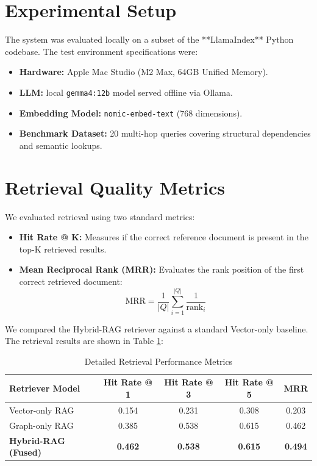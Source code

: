 \documentclass[12pt,a4paper,oneside]{report}
\begin{document}
\section{Experimental Setup}
The system was evaluated locally on a subset of the **LlamaIndex** Python codebase. The test environment specifications were:
\begin{itemize}
    \item \textbf{Hardware:} Apple Mac Studio (M2 Max, 64GB Unified Memory).
    \item \textbf{LLM:} local \texttt{gemma4:12b} model served offline via Ollama.
    \item \textbf{Embedding Model:} \texttt{nomic-embed-text} (768 dimensions).
    \item \textbf{Benchmark Dataset:} 20 multi-hop queries covering structural dependencies and semantic lookups.
\end{itemize}

\section{Retrieval Quality Metrics}
We evaluated retrieval using two standard metrics:
\begin{itemize}
    \item \textbf{Hit Rate @ K:} Measures if the correct reference document is present in the top-K retrieved results.
    \item \textbf{Mean Reciprocal Rank (MRR):} Evaluates the rank position of the first correct retrieved document:
    \begin{equation}
        \text{MRR} = \frac{1}{|Q|} \sum_{i=1}^{|Q|} \frac{1}{\text{rank}_i}
    \end{equation}
\end{itemize}

We compared the Hybrid-RAG retriever against a standard Vector-only baseline. The retrieval results are shown in Table \ref{tab:results_detail}:

\begin{table}[h]
    \centering
    \caption{Detailed Retrieval Performance Metrics}
    \label{tab:results_detail}
    \begin{tabular}{lcccc}
        \toprule
        \textbf{Retriever Model} & \textbf{Hit Rate @ 1} & \textbf{Hit Rate @ 3} & \textbf{Hit Rate @ 5} & \textbf{MRR} \\
        \midrule
        Vector-only RAG & 0.154 & 0.231 & 0.308 & 0.203 \\
        Graph-only RAG & 0.385 & 0.538 & 0.615 & 0.462 \\
        \textbf{Hybrid-RAG (Fused)} & \textbf{0.462} & \textbf{0.538} & \textbf{0.615} & \textbf{0.494} \\
        \bottomrule
    \end{tabular}
\end{table}
\end{document}
